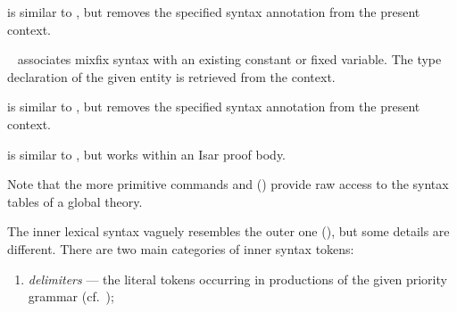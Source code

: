 \begin{isabellebody}
\begin{isamarkuptext}
\begin{description}
  \item \hyperlink{command.no-type-notation}{\mbox{}} is similar to \hyperlink{command.type-notation}{\mbox{}}, but removes the specified syntax annotation from
  the present context.

  \item \hyperlink{command.notation}{\mbox{}}~ associates mixfix
  syntax with an existing constant or fixed variable.  The type
  declaration of the given entity is retrieved from the context.

  \item \hyperlink{command.no-notation}{\mbox{}} is similar to \hyperlink{command.notation}{\mbox{}},
  but removes the specified syntax annotation from the present
  context.

  \item \hyperlink{command.write}{\mbox{}} is similar to \hyperlink{command.notation}{\mbox{}}, but
  works within an Isar proof body.

  \end{description}

  Note that the more primitive commands \hyperlink{command.syntax}{\mbox{}} and
  \hyperlink{command.no-syntax}{\mbox{}} () provide raw access
  to the syntax tables of a global theory.%
\end{isamarkuptext}%
\isamarkuptrue%
%
\isamarkuptrue%
%
\isamarkuptrue%
%
\begin{isamarkuptext}%
The inner lexical syntax vaguely resembles the outer one
  (), but some details are different.  There are
  two main categories of inner syntax tokens:

  \begin{enumerate}

  \item \emph{delimiters} --- the literal tokens occurring in
  productions of the given priority grammar (cf.\
  );


\end{enumerate}
\end{isamarkuptext}
\end{isabellebody}
